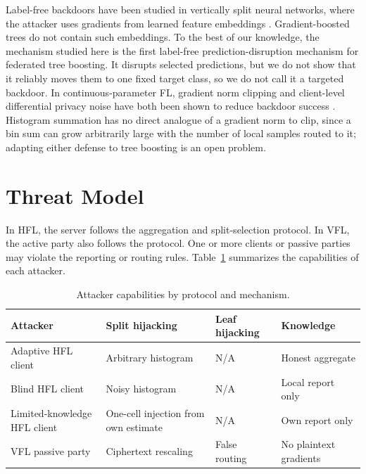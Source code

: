 \documentclass[11pt]{article}
\begin{document}
Label-free backdoors have been studied in vertically split neural networks, where the attacker uses gradients from learned feature embeddings \cite{shen2025labelfree}. Gradient-boosted trees do not contain such embeddings. To the best of our knowledge, the mechanism studied here is the first label-free prediction-disruption mechanism for federated tree boosting. It disrupts selected predictions, but we do not show that it reliably moves them to one fixed target class, so we do not call it a targeted backdoor. In continuous-parameter FL, gradient norm clipping and client-level differential privacy noise have both been shown to reduce backdoor success \cite{sun2019backdoor,geyer2017dpfed}. Histogram summation has no direct analogue of a gradient norm to clip, since a bin sum can grow arbitrarily large with the number of local samples routed to it; adapting either defense to tree boosting is an open problem.

\section{Threat Model}
\label{sec:threatmodel}

In HFL, the server follows the aggregation and split-selection protocol. In VFL, the active party also follows the protocol. One or more clients or passive parties may violate the reporting or routing rules. Table~\ref{tab:threatmodel} summarizes the capabilities of each attacker.

\begin{table}[htbp]
\centering
\caption{Attacker capabilities by protocol and mechanism.}
\begin{tabular}{>{\raggedright\arraybackslash}p{3.4cm}>{\raggedright\arraybackslash}p{4.0cm}>{\raggedright\arraybackslash}p{2.1cm}>{\raggedright\arraybackslash}p{3.4cm}}
\toprule
Attacker & Split hijacking & Leaf hijacking & Knowledge \\
\midrule
Adaptive HFL client & Arbitrary histogram & N/A & Honest aggregate \\
Blind HFL client & Noisy histogram & N/A & Local report only \\
Limited-knowledge HFL client & One-cell injection from own estimate & N/A & Own report only \\
VFL passive party & Ciphertext rescaling & False routing & No plaintext gradients \\
\bottomrule
\end{tabular}
\label{tab:threatmodel}
\end{table}
\end{document}
